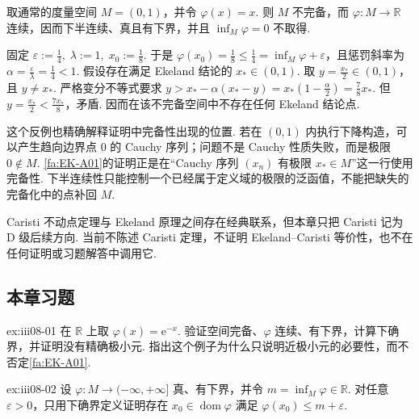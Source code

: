 \begin{FACounterexample}
取通常的度量空间 \(\displaystyle M=(0,1)\)，并令 \(\displaystyle\varphi(x)=x\). 则 \(\displaystyle M\) 不完备，而 \(\displaystyle\varphi:M\to\mathbb R\) 连续，因而下半连续、真且有下界，并且 \(\displaystyle\inf_M\varphi=0\) 不取得.

固定
\(\displaystyle \varepsilon:=\frac{1}{4}, \; \lambda:=1, \; x_0:=\frac{1}{8}\).
于是 \(\displaystyle\varphi(x_0)=\frac{1}{8}\leqslant\frac{1}{4}=\inf_M\varphi+\varepsilon\)，且惩罚斜率为 \(\displaystyle\alpha=\frac{\varepsilon}{\lambda}=\frac{1}{4}<1\). 假设存在满足 Ekeland 结论的 \(\displaystyle x_*\in(0,1)\). 取 \(\displaystyle y=\frac{x_*}{2}\in(0,1)\)，且 \(\displaystyle y\neq x_*\). 严格变分不等式要求
\(\displaystyle y > x_*-\alpha(x_*-y) = x_*\left(1-\frac{\alpha}{2}\right) = \frac{7}{8}x_*\).
但 \(\displaystyle y=\frac{x_*}{2}<\frac{7x_*}{8}\)，矛盾. 因而在该不完备空间中不存在任何 Ekeland 结论点.
\end{FACounterexample}

这个反例也精确解释证明中完备性出现的位置. 若在 \(\displaystyle(0,1)\) 内执行下降构造，可以产生趋向边界点 \(\displaystyle0\) 的 Cauchy 序列；问题不是 Cauchy 性质失败，而是极限 \(\displaystyle0\notin M\). \autoref{fa:EK-A01}的证明正是在“Cauchy 序列 \(\displaystyle(x_n)\) 有极限 \(\displaystyle x_*\in M\)”这一行使用完备性. 下半连续性只能控制一个已经属于定义域的极限的泛函值，不能把缺失的完备化中的点补回 \(\displaystyle M\).

\begin{FARemark}
Caristi 不动点定理与 Ekeland 原理之间存在经典联系，但本章只把 Caristi 记为 D 级后续方向. 当前不陈述 Caristi 定理，不证明 Ekeland--Caristi 等价性，也不在任何证明或习题解答中调用它.
\end{FARemark}

\subsection*{本章习题}\label{sec:iii08-exercises}

\begin{FAExercise}[精确极小值失效]{ex:iii08-01}
在 \(\displaystyle\mathbb R\) 上取 \(\displaystyle\varphi(x)=\mathrm{e}^{-x}\). 验证空间完备、\(\displaystyle\varphi\) 连续、有下界，计算下确界，并证明没有精确极小元. 指出这个例子为什么只说明近极小元的必要性，而不否定\autoref{fa:EK-A01}.
\end{FAExercise}

\begin{FAExercise}[由下确界得到近极小元]{ex:iii08-02}
设 \(\displaystyle\varphi:M\to(-\infty,+\infty]\) 真、有下界，并令 \(\displaystyle m=\inf_M\varphi\in\mathbb R\). 对任意 \(\displaystyle\varepsilon>0\)，只用下确界定义证明存在 \(\displaystyle x_0\in\operatorname{dom}\varphi\) 满足 \(\displaystyle\varphi(x_0)\leqslant m+\varepsilon\).
\end{FAExercise}

